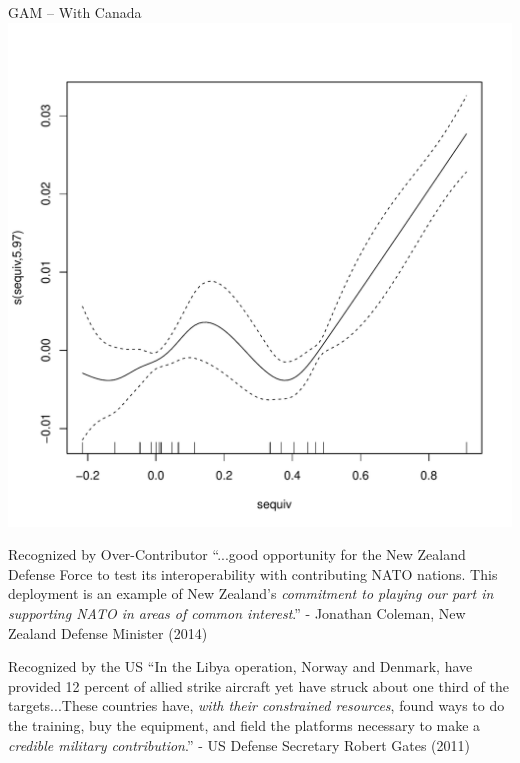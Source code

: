 \documentclass[11pt]{beamer}
\begin{document}
\begin{frame}{GAM -- With Canada}
  \centering
    \includegraphics[scale=0.5]{../figures/can_gam.pdf}
\end{frame}


\begin{frame}{Recognized by Over-Contributor}
``...good opportunity for the New Zealand Defense Force to test its interoperability with contributing NATO nations. This deployment is an example of New Zealand's \textit{commitment to playing our part in supporting NATO in areas of common interest}.'' - Jonathan Coleman, New Zealand Defense Minister (2014)
\end{frame}

\begin{frame}{Recognized by the US}
``In the Libya operation, Norway and Denmark, have provided 12 percent of allied strike aircraft yet have struck about one third of the targets...These countries have, \textit{with their constrained resources}, found ways to do the training, buy the equipment, and field the platforms necessary to make a \textit{credible military contribution}.'' - US Defense Secretary Robert Gates (2011)
\end{frame}
\end{document}
